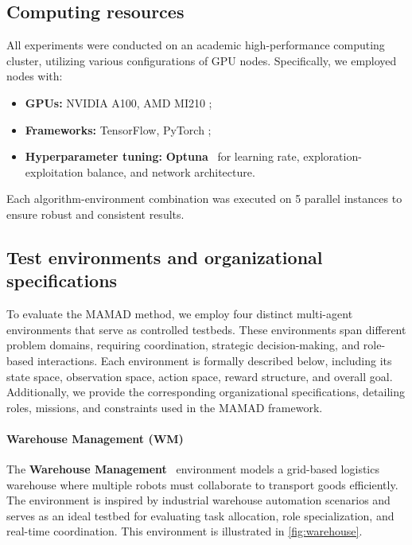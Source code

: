 \documentclass[journal]{IEEEtai}
\begin{document}
\subsection{Computing resources}

All experiments were conducted on an academic high-performance computing cluster, utilizing various configurations of GPU nodes. Specifically, we employed nodes with:
\begin{itemize}
    \item \textbf{GPUs:} NVIDIA A100, AMD MI210 ;
    \item \textbf{Frameworks:} TensorFlow, PyTorch ;
    \item \textbf{Hyperparameter tuning:} \textbf{Optuna}~\cite{akiba2019optuna} for learning rate, exploration-exploitation balance, and network architecture.
\end{itemize}

Each algorithm-environment combination was executed on 5 parallel instances to ensure robust and consistent results.

\subsection{Test environments and organizational specifications}

To evaluate the MAMAD method, we employ four distinct multi-agent environments that serve as controlled testbeds. These environments span different problem domains, requiring coordination, strategic decision-making, and role-based interactions. Each environment is formally described below, including its state space, observation space, action space, reward structure, and overall goal. Additionally, we provide the corresponding organizational specifications, detailing roles, missions, and constraints used in the MAMAD framework.

\paragraph{Warehouse Management (WM)}
The \textbf{Warehouse Management}~\cite{warehouse_management} environment models a grid-based logistics warehouse where multiple robots must collaborate to transport goods efficiently. The environment is inspired by industrial warehouse automation scenarios and serves as an ideal testbed for evaluating task allocation, role specialization, and real-time coordination. This environment is illustrated in \autoref{fig:warehouse}.
\end{document}
